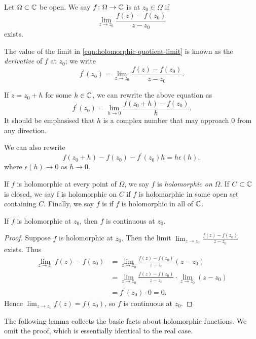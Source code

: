 \begin{definition}
Let $\Omega\subset\mathbb C$ be open. We say $f\colon\Omega\to\mathbb C$ is  at $z_0\in\Omega$ if
\begin{equation}\label{eqn:holomorphic-quotient-limit}
\lim_{z\to z_0}\frac{f(z)-f(z_0)}{z-z_0}
\end{equation}
exists.
\end{definition}

The value of the limit in \eqref{eqn:holomorphic-quotient-limit} is known as the \emph{derivative} of $f$ at $z_0$; we write
\[f^\prime(z_0)=\lim_{z\to z_0}\frac{f(z)-f(z_0)}{z-z_0}.\]

If $z=z_0+h$ for some $h\in\mathbb C$, we can rewrite the above equation as 
\[f^\prime(z_0)=\lim_{h\to 0}\frac{f(z_0+h)-f(z_0)}{h}.\]
It should be emphasised that $h$ is a complex number that may approach $0$ from any direction.

We can also rewrite
\begin{equation}
f(z_0+h)-f(z_0)-f^\prime(z_0)h=h\epsilon(h),
\end{equation}
where $\epsilon(h)\to0$ as $h\to 0$.

If $f$ is holomorphic at every point of $\Omega$, we say $f$ is \emph{holomorphic on} $\Omega$. 
If $C\subset\mathbb C$ is closed, we say f is holomorphic on $C$ if $f$ is holomorphic in some open set containing $C$.
Finally, we say $f$ is  if $f$ is holomorphic in all of $\mathbb C$.

\begin{lemma}
If $f$ is holomorphic at $z_0$, then $f$ is continuous at $z_0$.
\end{lemma}

\begin{proof}
Suppose $f$ is holomorphic at $z_0$. Then the limit $\displaystyle\lim_{z\to z_0}\frac{f(z)-f(z_0)}{z-z_0}$ exists. Thus
\begin{align*}
\lim_{z\to z_0}f(z)-f(z_0)
&=\lim_{z\to z_0}\frac{f(z)-f(z_0)}{z-z_0}(z-z_0)\\
&=\lim_{z\to z_0}\frac{f(z)-f(z_0)}{z-z_0}\cdot\lim_{z\to z_0}(z-z_0)\\
&=f^\prime(z_0)\cdot0=0.
\end{align*}
Hence $\displaystyle\lim_{z\to z_0}f(z)=f(z_0)$, so $f$ is continuous at $z_0$.
\end{proof}

The following lemma collects the basic facts about holomorphic functions. We omit the proof, which is essentially identical to the real case.

